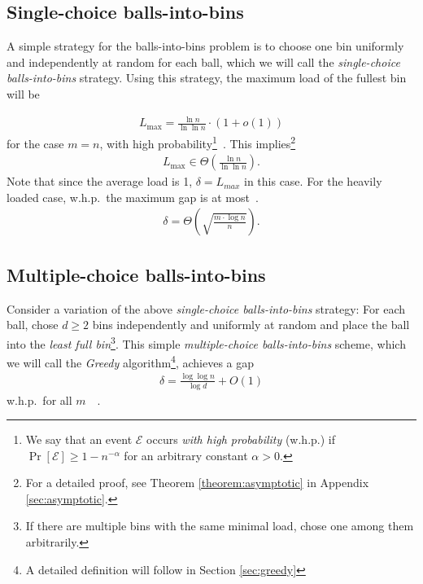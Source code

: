 \documentclass[a4paper,12pt]{article}
\newcommand\load{L_{\mathrm{max}}}
\begin{document}
\subsection{Single-choice balls-into-bins}
\label{sec:single-choice}
A simple strategy for the balls-into-bins problem is to choose one bin uniformly and independently at random for each ball, which we will call the \emph{single-choice balls-into-bins} strategy. Using this strategy, the maximum load of the fullest bin will be
\begin{comment}
\footnote{A more accurate result exists: The maximum load is $\load = \Gamma^{-1}\left(n\right)\left(1+O\left(\frac{1}{\log \Gamma^{-1}\left(n\right)}\right)\right)$ \cite{G91}.}
\end{comment}
\begin{align*}
\load = \frac{\ln n}{\ln \ln n} \cdot \left(1 + o\left(1\right)\right)
\end{align*}
for the case $m=n$, with high probability\footnote{We say that an event $\mathcal E$ occurs \emph{with high probability} (w.h.p.) if $\Pr\left[\mathcal E \right] \geq 1 - n^{-\alpha}$ for an arbitrary constant $\alpha > 0$.}~\cite{RS98}. This implies\footnote{For a detailed proof, see Theorem \ref{theorem:asymptotic} in Appendix \ref{sec:asymptotic}.}
\begin{align*}
\load\in \Theta\left(\frac{\ln n}{\ln \ln n}\right).
\end{align*}
Note that since the average load is 1, $\delta = L_{max}$ in this case. For the heavily loaded case, w.h.p.~the maximum gap is at most~\cite{RS98}.
\begin{align*}
\delta = \Theta\left(\sqrt{\frac{m \cdot \log n}{n}}\right).
\end{align*}

\subsection{Multiple-choice balls-into-bins}
Consider a variation of the above \emph{single-choice balls-into-bins} strategy: For each ball, chose $d \geq 2$ bins independently and uniformly at random and place the ball into the \emph{least full bin}\footnote{If there are multiple bins with the same minimal load, chose one among them arbitrarily.}. This simple \emph{multiple-choice balls-into-bins} scheme, which we will call the \emph{Greedy} algorithm\footnote{A detailed definition will follow in Section \ref{sec:greedy}}, achieves a gap
\begin{align*}
\delta = \frac{\log \log n}{\log d} + O(1)
\end{align*}
 w.h.p.~for all $m$~\cite{ABKU99}~\cite{BCSV06}.
 
\end{document}
